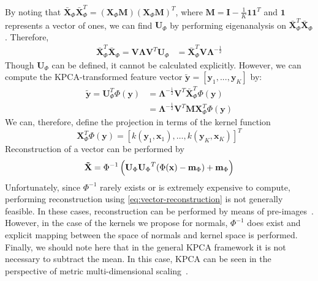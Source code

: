 By noting that 
$\mathbf{\bar{X}}_\Phi \mathbf{\bar{X}}_\Phi^T = (\mathbf{X}_\Phi \mathbf{M}) (\mathbf{X}_\Phi \mathbf{M})^T$, 
where $\mathbf{M} = \mathbf{I} - \frac{1}{K} \mathbf{1} \mathbf{1}^T$ and
$\mathbf{1}$ represents a vector of ones, we can find
$\mathbf{U}_\Phi$ by performing eigenanalysis on
$\bar{\mathbf{X}}_\Phi^T \bar{\mathbf{X}}_\Phi$. Therefore,
\begin{equation}
    \begin{aligned}\label{eq:x-bar-corr}
        \mathbf{\bar{X}}_\Phi^T \mathbf{\bar{X}}_\Phi = \mathbf{V} \boldsymbol{\Lambda} \mathbf{V}^T \mathbf{U}_{\Phi} &= \mathbf{\bar{X}}_\Phi^T \mathbf{V} \boldsymbol{\Lambda}^{-\frac{1}{2}}
    \end{aligned}
\end{equation}
Though $\mathbf{U}_\Phi$ can be defined, it cannot be calculated explicitly. 
However, we can compute the KPCA-transformed feature vector
 $\mathbf{\tilde{y}} = [\mathbf{y}_1, ..., \mathbf{y}_K]$ by:
\begin{equation}
    \begin{aligned}\label{eq:projections}
        \mathbf{\tilde{y}} = \mathbf{U}_\Phi^T \Phi(\mathbf{y}) &= \boldsymbol{\Lambda}^{-\frac{1}{2}} \mathbf{V}^T \mathbf{\bar{X}}_\Phi^T \Phi(\mathbf{y}) \\
        &= \boldsymbol{\Lambda}^{-\frac{1}{2}} \mathbf{V}^T \mathbf{M} \mathbf{X}_\Phi^T \Phi(\mathbf{y})
    \end{aligned}
\end{equation}
We can, therefore, define the projection in terms of the kernel function
\begin{equation}\label{eq:kernel-vector}
        \mathbf{X}_\Phi^T \Phi(\mathbf{y}) = \left[ k(\mathbf{y}_1, \mathbf{x}_1), \ldots, k(\mathbf{y}_K, \mathbf{x}_K) \right]^T
\end{equation}
Reconstruction of a vector can be performed by
\begin{equation}\label{eq:vector-reconstruction}
        \boldsymbol{\mathbf{\tilde{X}}} = {\Phi}^{-1} \left( \mathbf{U}_{\Phi} {\mathbf{U}_{\Phi}}^T (\Phi(\mathbf{x}) - \mathbf{m}_{\Phi}) + \mathbf{m}_{\Phi} \right)
\end{equation}
Unfortunately, since ${\Phi}^{-1}$ rarely exists or is extremely expensive to 
compute, performing reconstruction using \cref{eq:vector-reconstruction} is not 
generally feasible. In these cases, reconstruction can be performed by means of 
pre-images~\cite{kwok2004pre}. However, in the case of the kernels we propose
for normals, ${\Phi}^{-1}$ does exist and explicit mapping between the space of
normals and kernel space is performed. Finally, we should note here that in the 
general KPCA framework it is not necessary to subtract the mean. In this case, 
KPCA can be seen in the perspective of metric multi-dimensional 
scaling~\cite{williams2002connection}.
